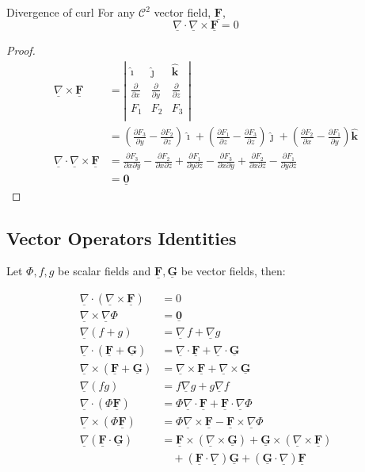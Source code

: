 \documentclass{article}
\renewcommand{\vec}[1]{\underline{\textbf{#1}}}
\newcommand{\veci}{\bm{\hat{\imath}}}
\newcommand{\vecj}{\bm{\hat{\jmath}}}
\newcommand{\veck}{\bm{\hat{k}}}
\newcommand{\p}{\Phi}
\newcommand{\pa}{\partial}
\newcommand{\nab}{\underline{\nabla}}
\newcommand{\grad}{{\nab}\, f}
\newcommand{\pd}[2]{\frac{\partial #1}{\partial #2}}
\renewcommand{\div}{\nab \cdot}
\newcommand{\curl}{\nab \times}
\begin{document}
\noindent\begin{theorem}{Divergence of curl}{}
 For any $\mathcal{C}^2$ vector field, $\vec F$,
 $$ \div \curl \vec F = 0 $$
\end{theorem}\vspace{10pt}
\begin{proof}
  \begin{align*}
    \curl \vec F &= \left|\begin{matrix}
      \veci & \vecj & \veck \\
      \pd{}{x} & \pd{}{y} & \pd{}{z} \\
      F_1 & F_2 & F_3 \\
    \end{matrix}\right|\\
  &= \left( \pd{F_3}{y} - \pd{F_2}{z} \right)\veci + \left(\pd{F_1}{z} - \pd{F_3}{z}\right)\vecj + \left(\pd{F_2}{x} - \pd{F_1}{y} \right)\veck\\
  \div\curl\vec F &= \pd{F_3}{x\pa y} - \pd{F_2}{x\pa z} + \pd{F_1}{y \pa z} - \pd{F_3}{x \pa y} + \pd{F_2}{x \pa z} - \pd{F_1}{y \pa z}\\
  &= \vec 0
  \end{align*}
\end{proof}

\subsection{Vector Operators Identities}
Let $\p, f, g$ be scalar fields and $\vec F, \vec G$ be vector fields, then:

\begin{align}
  \div(\curl\vec F) &= 0\\
  \curl\nab\p &= \vec 0\\
  \nab(f + g) &= \grad + \nab g\\
  \div(\vec F + \vec G) &= \div\vec F + \div\vec G \\
  \curl(\vec F + \vec G) &= \curl\vec F + \curl\vec G\\
  \nab(fg) &= f\nab g + g\nab f\\
  \div(\p\vec F) &= \p\div\vec F + \vec F \cdot \nab\p\\
  \curl(\p\vec F) &= \p\curl\vec F - \vec F\times\nab\p \\
  \nab(\vec F \cdot\vec G) &= \vec F\times(\curl \vec G) + \vec G\times(\curl \vec F) \\
  &\quad + (\vec F \cdot\nab)\vec G + (\vec G \cdot \nab)\vec F\\
\end{align}
\end{document}
